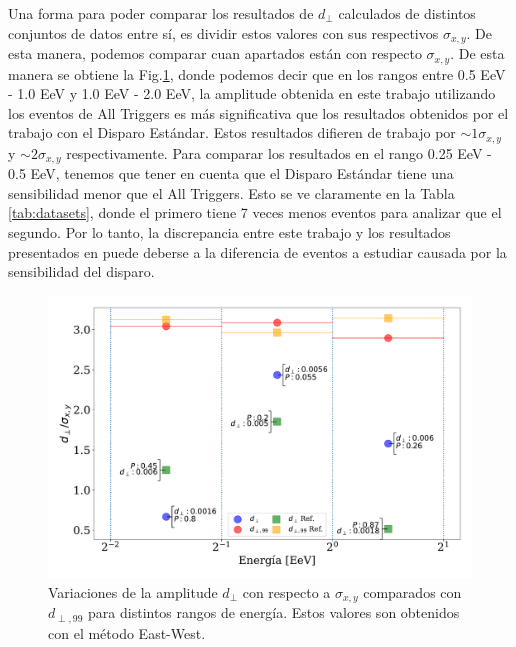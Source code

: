 \documentclass[12pt, doublespace, oneside]{article}
\begin{document}
    Una forma  para poder comparar los resultados de $d_\perp$ calculados de distintos conjuntos de  datos entre sí, es dividir estos valores con  sus respectivos $\sigma_{x,y}$. De esta manera, podemos comparar cuan apartados están con respecto $\sigma_{x,y}$. De esta manera se obtiene la Fig.\ref{fig:normalizado_sigma}, donde podemos decir que en los rangos entre 0.5 EeV - 1.0 EeV y 1.0 EeV - 2.0 EeV, la amplitude obtenida en este trabajo utilizando los eventos de All Triggers es más significativa que los resultados obtenidos por el trabajo \cite{Aab_2020} con el Disparo Estándar. Estos resultados difieren de trabajo \cite{Aab_2020} por $\sim 1\sigma_{x,y}$ y $\sim 2 \sigma_{x,y}$ respectivamente. Para comparar los resultados en el  rango 0.25 EeV - 0.5 EeV, tenemos que tener en cuenta que el Disparo Estándar tiene una sensibilidad menor que el All Triggers. Esto se ve claramente en la Tabla \ref{tab:datasets}, donde el primero tiene 7 veces menos eventos para analizar que el segundo. Por lo tanto, la discrepancia entre este trabajo y los resultados presentados en \cite{Aab_2020} puede deberse a la  diferencia de eventos a estudiar causada por la sensibilidad del disparo.

    \begin{figure}[H]
        \begin{small}
            \begin{center}
                \vspace*{-0.21 cm}
                \includegraphics[width=\textwidth]{Figs/d_perp_normalizado_sigmas_v6.pdf}
                \vspace*{-1 cm}
            \end{center}
            \caption{Variaciones de la amplitude $d_\perp$ con respecto a $\sigma_{x,y}$ comparados con $d_{\perp,99}$ para distintos rangos de energía. Estos valores son obtenidos con el método East-West. }
            \label{fig:normalizado_sigma}
        \end{small}
    \end{figure}
\end{document}
